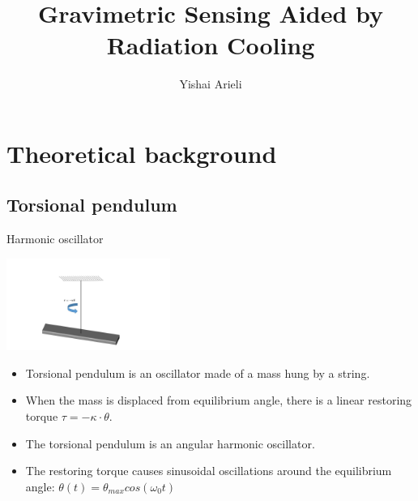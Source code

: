 \documentclass{beamer}
\title[Gravimetric Sensing Aided by Radiation Cooling]{Gravimetric Sensing Aided by Radiation Cooling}
\author[Yishai Arieli]{Yishai Arieli}
\begin{document}
	\typesetFrontSlides

\section{Theoretical background}
\subsection{Torsional pendulum}
\begin{frame}{Harmonic oscillator}
	\begin{center}		
		\includegraphics[width=0.4\textwidth,keepaspectratio]{torsion_pendulum_powerpoint.jpg}
    \end{center}
	\begin{itemize}

		\item Torsional pendulum is an oscillator made of a mass hung by a string. 
		\pause
		\item When the mass is displaced from equilibrium angle, there is a linear restoring torque $\tau = -\kappa\cdot\theta$.
		\pause
		\item The torsional pendulum is an angular harmonic oscillator.
		\pause
		\item The restoring torque causes sinusoidal oscillations around the equilibrium angle: $\theta(t) = \theta_{max}cos(\omega_0 t )$
		
	\end{itemize}
\end{frame}
\end{document}
